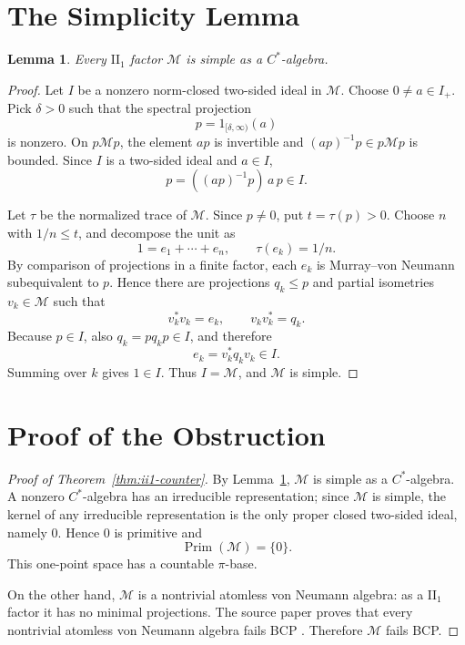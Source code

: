 \documentclass[11pt]{article}
\newtheorem{lemma}{Lemma}
\newcommand{\Prim}{\operatorname{Prim}}
\newcommand{\M}{\mathcal M}
\begin{document}
\section*{The Simplicity Lemma}

\begin{lemma}
\label{lem:ii1-simple}
Every \(\mathrm{II}_1\) factor \(\M\) is simple as a \(C^*\)-algebra.
\end{lemma}

\begin{proof}
Let \(I\) be a nonzero norm-closed two-sided ideal in \(\M\).  Choose
\(0\ne a\in I_+\).  Pick \(\delta>0\) such that the spectral projection
\[
        p=1_{[\delta,\infty)}(a)
\]
is nonzero.  On \(p\M p\), the element \(ap\) is invertible and
\((ap)^{-1}p\in p\M p\) is bounded.  Since \(I\) is a two-sided ideal and
\(a\in I\),
\[
        p=((ap)^{-1}p)\,a\,p\in I.
\]

Let \(\tau\) be the normalized trace of \(\M\).  Since \(p\ne0\), put
\(t=\tau(p)>0\).  Choose \(n\) with \(1/n\le t\), and decompose the unit as
\[
        1=e_1+\cdots+e_n,
        \qquad \tau(e_k)=1/n .
\]
By comparison of projections in a finite factor, each \(e_k\) is
Murray--von Neumann subequivalent to \(p\).  Hence there are projections
\(q_k\le p\) and partial isometries \(v_k\in\M\) such that
\[
        v_k^*v_k=e_k,\qquad v_kv_k^*=q_k .
\]
Because \(p\in I\), also \(q_k=pq_kp\in I\), and therefore
\[
        e_k=v_k^*q_kv_k\in I .
\]
Summing over \(k\) gives \(1\in I\).  Thus \(I=\M\), and \(\M\) is simple.
\end{proof}

\section*{Proof of the Obstruction}

\begin{proof}[Proof of Theorem~\ref{thm:ii1-counter}]
By Lemma~\ref{lem:ii1-simple}, \(\M\) is simple as a \(C^*\)-algebra.  A
nonzero \(C^*\)-algebra has an irreducible representation; since \(\M\) is
simple, the kernel of any irreducible representation is the only proper
closed two-sided ideal, namely \(0\).  Hence \(0\) is primitive and
\[
        \Prim(\M)=\{0\}.
\]
This one-point space has a countable \(\pi\)-base.

On the other hand, \(\M\) is a nontrivial atomless von Neumann algebra: as a
\(\mathrm{II}_1\) factor it has no minimal projections.  The source paper
proves that every nontrivial atomless von Neumann algebra fails BCP
\cite[Theorem labelled \textup{atomlessnotbcp}; equivalently by the main von
Neumann classification, Theorem labelled \textup{main1}]{HKL}.  Therefore
\(\M\) fails BCP.
\end{proof}
\end{document}
